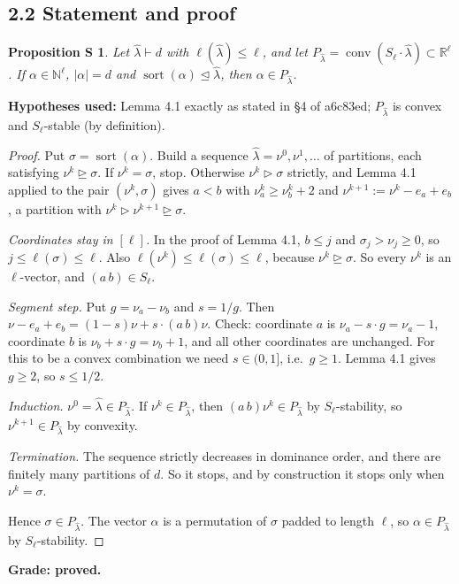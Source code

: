 \documentclass[11pt]{amsart}
\newcommand{\lh}{\hat\lambda}
\newcommand{\N}{\mathbb{N}}
\newcommand{\R}{\mathbb{R}}
\newcommand{\sort}{\operatorname{sort}}
\newcommand{\dom}{\trianglelefteq}
\newcommand{\domg}{\trianglerighteq}
\newcommand{\sdomg}{\triangleright}
\newtheorem*{propS}{Proposition S}
\begin{document}
\subsection*{2.2 Statement and proof}
\begin{propS}
Let $\lh\vdash d$ with $\ell(\lh)\le\ell$, and let $P_{\lh}=\operatorname{conv}(S_\ell\cdot\lh)\subset\R^\ell$. If $\alpha\in\N^\ell$, $|\alpha|=d$ and $\sort(\alpha)\dom\lh$, then $\alpha\in P_{\lh}$.
\end{propS}
\noindent\textbf{Hypotheses used:} Lemma 4.1 exactly as stated in \S4 of a6c83ed; $P_{\lh}$ is convex and $S_\ell$-stable (by definition).

\begin{proof}
Put $\sigma=\sort(\alpha)$. Build a sequence $\lh=\nu^0,\nu^1,\dots$ of partitions, each satisfying $\nu^k\domg\sigma$. If $\nu^k=\sigma$, stop. Otherwise $\nu^k\sdomg\sigma$ strictly, and Lemma 4.1 applied to the pair $(\nu^k,\sigma)$ gives $a<b$ with $\nu^k_a\ge\nu^k_b+2$ and $\nu^{k+1}:=\nu^k-e_a+e_b$, a partition with $\nu^k\sdomg\nu^{k+1}\domg\sigma$.

\emph{Coordinates stay in $[\ell]$.} In the proof of Lemma 4.1, $b\le j$ and $\sigma_j>\nu_j\ge0$, so $j\le\ell(\sigma)\le\ell$. Also $\ell(\nu^k)\le\ell(\sigma)\le\ell$, because $\nu^k\domg\sigma$. So every $\nu^k$ is an $\ell$-vector, and $(a\,b)\in S_\ell$.

\emph{Segment step.} Put $g=\nu_a-\nu_b$ and $s=1/g$. Then $\nu-e_a+e_b=(1-s)\nu+s\cdot(a\,b)\nu$. Check: coordinate $a$ is $\nu_a-s\cdot g=\nu_a-1$, coordinate $b$ is $\nu_b+s\cdot g=\nu_b+1$, and all other coordinates are unchanged. For this to be a convex combination we need $s\in(0,1]$, i.e.\ $g\ge1$. Lemma 4.1 gives $g\ge2$, so $s\le1/2$.

\emph{Induction.} $\nu^0=\lh\in P_{\lh}$. If $\nu^k\in P_{\lh}$, then $(a\,b)\nu^k\in P_{\lh}$ by $S_\ell$-stability, so $\nu^{k+1}\in P_{\lh}$ by convexity.

\emph{Termination.} The sequence strictly decreases in dominance order, and there are finitely many partitions of $d$. So it stops, and by construction it stops only when $\nu^k=\sigma$.

Hence $\sigma\in P_{\lh}$. The vector $\alpha$ is a permutation of $\sigma$ padded to length $\ell$, so $\alpha\in P_{\lh}$ by $S_\ell$-stability.
\end{proof}
\noindent\textbf{Grade: proved.}
\end{document}
